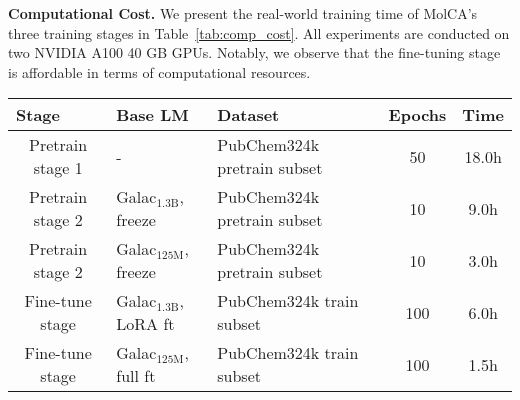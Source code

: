 \documentclass[11pt]{article}
\begin{document}
\textbf{Computational Cost.} We present the real-world training time of MolCA's three training stages in Table~\ref{tab:comp_cost}. All experiments are conducted on two NVIDIA A100 40 GB GPUs. Notably, we observe that the fine-tuning stage is affordable in terms of computational resources. 



\begin{table*}[th!]
\centering
\small
\begin{tabular}{cllcc}\toprule
\multicolumn{1}{l}{Stage} & Base LM                        & Dataset                     & \multicolumn{1}{l}{Epochs} & Time  \\ \midrule
Pretrain stage 1          & -                              & PubChem324k pretrain subset & 50                         & 18.0h \\
Pretrain stage 2          & Galac$_{\text{1.3B}}$, freeze  & PubChem324k pretrain subset & 10                         & 9.0h  \\
Pretrain stage 2          & Galac$_{\text{125M}}$, freeze  & PubChem324k pretrain subset & 10                         & 3.0h  \\
Fine-tune stage           & Galac$_{\text{1.3B}}$, LoRA ft & PubChem324k train subset    & 100                        & 6.0h  \\
Fine-tune stage           & Galac$_{\text{125M}}$, full ft & PubChem324k train subset    & 100                        & 1.5h  \\\bottomrule
\end{tabular}
\caption{Compuational cost for MolCA's three stages.}
\label{tab:comp_cost}
\end{table*} 
\end{document}
